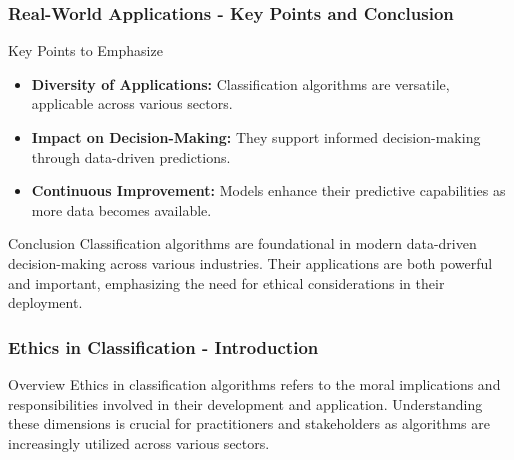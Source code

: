 \documentclass{beamer}
\begin{document}
\begin{frame}[fragile]
    \frametitle{Real-World Applications - Key Points and Conclusion}
    \begin{block}{Key Points to Emphasize}
        \begin{itemize}
            \item \textbf{Diversity of Applications:} Classification algorithms are versatile, applicable across various sectors.
            \item \textbf{Impact on Decision-Making:} They support informed decision-making through data-driven predictions.
            \item \textbf{Continuous Improvement:} Models enhance their predictive capabilities as more data becomes available.
        \end{itemize}
    \end{block}
    
    \begin{block}{Conclusion}
        Classification algorithms are foundational in modern data-driven decision-making across various industries. Their applications are both powerful and important, emphasizing the need for ethical considerations in their deployment.
    \end{block}
\end{frame}

\begin{frame}[fragile]
    \frametitle{Ethics in Classification - Introduction}
    \begin{block}{Overview}
        Ethics in classification algorithms refers to the moral implications and responsibilities involved in their development and application. Understanding these dimensions is crucial for practitioners and stakeholders as algorithms are increasingly utilized across various sectors.
    \end{block}
\end{frame}
\end{document}
